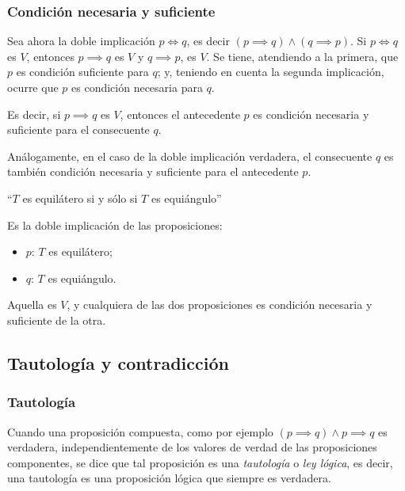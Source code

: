 \subsubsection{Condición necesaria y suficiente}

Sea ahora la doble implicación $p \iff q$, es decir $(p \implies q) \land (q \implies p)$. Si $p \iff q$ es $V$, entonces $p \implies q$ es $V$ y $q \implies p$, es $V$. Se tiene, atendiendo a la primera, que $p$ es condición suficiente para $q$; y, teniendo en cuenta la segunda implicación, ocurre que $p$ es condición necesaria para $q$.

Es decir, si $p \implies q$ es $V$, entonces el antecedente $p$ es condición necesaria y suficiente para el consecuente $q$.

Análogamente, en el caso de la doble implicación verdadera, el consecuente $q$ es también condición necesaria y suficiente para el antecedente $p$.

\begin{fmd-example}
	``$T$ es equilátero si y sólo si $T$ es equiángulo''
	
	Es la doble implicación de las proposiciones:
	\begin{itemize}
		\item $p$: $T$ es equilátero;
		\item $q$: $T$ es equiángulo.
	\end{itemize}
	Aquella es $V$, y cualquiera de las dos proposiciones es condición necesaria y suficiente de la otra.
\end{fmd-example}

\subsection{Tautología y contradicción}

\subsubsection{Tautología}
\vspace{1em}
\begin{fmd-definition}[Tautología]
	Cuando una proposición compuesta, como por ejemplo $(p \implies q) \land p \implies q$ es verdadera, independientemente de los valores de verdad de las proposiciones componentes, se dice que tal proposición es una \textit{tautología} o \textit{ley lógica}, es decir, una tautología es una proposición lógica que siempre es verdadera.
\end{fmd-definition}

